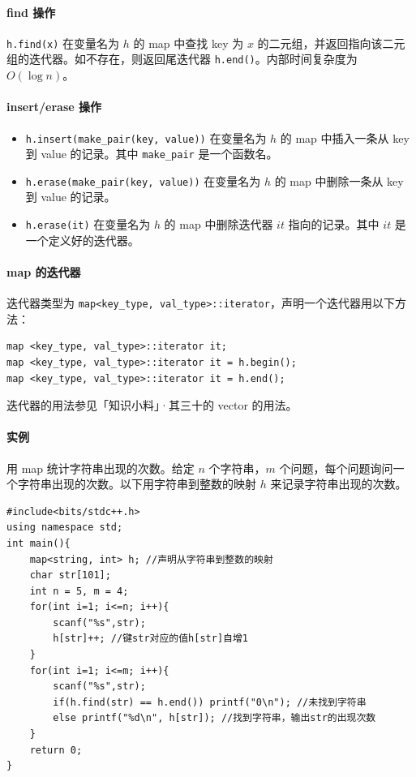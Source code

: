 \documentclass[UTF8]{ctexart}
\begin{document}
\paragraph{find 操作}
\verb!h.find(x)! 在变量名为 $h$ 的 map 中查找 key 为 $x$ 的二元组，并返回指向该二元组的迭代器。如不存在，则返回尾迭代器 \verb!h.end()!。内部时间复杂度为 $O(\log n)$。

\paragraph{insert/erase 操作}
\begin{itemize}
    \item \verb!h.insert(make_pair(key, value))! 在变量名为 $h$ 的 map 中插入一条从 key 到 value 的记录。其中 \verb!make_pair! 是一个函数名。

    \item \verb!h.erase(make_pair(key, value))! 在变量名为 $h$ 的 map 中删除一条从 key 到 value 的记录。

    \item \verb!h.erase(it)! 在变量名为 $h$ 的 map 中删除迭代器 $it$ 指向的记录。其中 $it$ 是一个定义好的迭代器。
\end{itemize}

\paragraph{map 的迭代器} 迭代器类型为 \verb!map<key_type, val_type>::iterator!，声明一个迭代器用以下方法：
\begin{lstlisting}[numbers=none]
map <key_type, val_type>::iterator it;
map <key_type, val_type>::iterator it = h.begin();
map <key_type, val_type>::iterator it = h.end();
\end{lstlisting}
迭代器的用法参见「知识小料」·其三十的 vector 的用法。

\paragraph{实例} 用 map 统计字符串出现的次数。给定 $n$ 个字符串，$m$ 个问题，每个问题询问一个字符串出现的次数。以下用字符串到整数的映射 $h$ 来记录字符串出现的次数。
\begin{lstlisting}
#include<bits/stdc++.h>
using namespace std;
int main(){
	map<string, int> h; //声明从字符串到整数的映射
	char str[101];
	int n = 5, m = 4;
	for(int i=1; i<=n; i++){
		scanf("%s",str);
		h[str]++; //键str对应的值h[str]自增1
	}
	for(int i=1; i<=m; i++){
		scanf("%s",str);
		if(h.find(str) == h.end()) printf("0\n"); //未找到字符串
		else printf("%d\n", h[str]); //找到字符串，输出str的出现次数
	}
	return 0;
}
\end{lstlisting}
\end{document}
